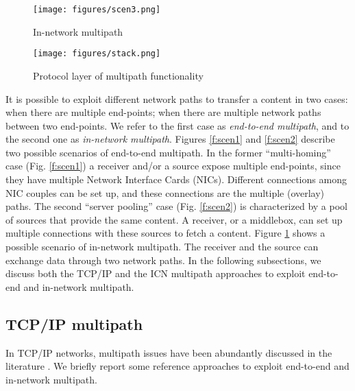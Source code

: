 \documentclass{sig-alternate-10pt}
\begin{document}
\begin{figure}[t]
\centering
\texttt{[image: figures/scen3.png]}
\caption{In-network multipath}
\label{f:scen3}
\vspace{-10pt}
\end{figure}

\begin{figure}[t]
\centering
\texttt{[image: figures/stack.png]}
\caption{Protocol layer of multipath functionality}
\label{f:stack}
\vspace{-10pt}
\end{figure}

It is possible to exploit different network paths to transfer a content in two cases: when there are multiple end-points; when there are multiple network paths between two end-points. We refer to the first case as \emph{end-to-end multipath}, and to the second one as \emph{in-network multipath}.
Figures \ref{f:scen1} and \ref{f:scen2} describe two possible scenarios of end-to-end multipath. In the former ``multi-homing'' case (Fig. \ref{f:scen1}) a receiver and/or a source expose multiple end-points, since they have multiple Network Interface Cards (NICs). Different connections among NIC couples can be set up, and these connections are the multiple (overlay) paths.
The second ``server pooling'' case (Fig. \ref{f:scen2}) is characterized by a pool of sources that provide the same content. A receiver, or a middlebox, can set up multiple connections with these sources to fetch a content.
Figure \ref{f:scen3} shows a possible scenario of in-network multipath. The receiver and the source can exchange data through two network paths. In the following subsections, we discuss both the TCP/IP and the ICN multipath approaches to exploit end-to-end and in-network multipath.



\subsection*{TCP/IP multipath}
In TCP/IP networks, multipath issues have been abundantly discussed in the literature \cite{he2008toward}. We briefly report some reference approaches to exploit end-to-end and in-network multipath. 
\end{document}
